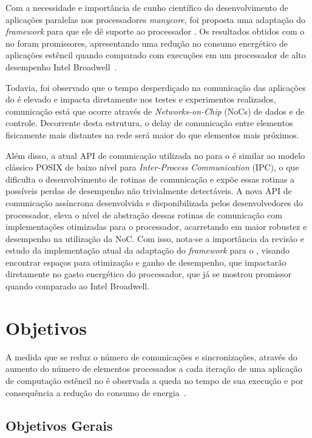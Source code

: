 Com a necessidade e importância de cunho científico do desenvolvimento de aplicações paralelas nos processadores \textit{manycore}, foi proposta uma adaptação do \textit{framework} \pskel para que ele dê suporte ao processador \mppa. Os resultados obtidos com o \pskel no \mppa foram promissores, apresentando uma redução no consumo energético de aplicações estêncil quando comparado  com execuções em um processador de alto desempenho Intel Broadwell~\cite{wscad2017}.

Todavia, foi observado que o tempo desperdiçado na comunicação das aplicações do \mppa é elevado e impacta diretamente nos testes e experimentos realizados, comunicação está que ocorre através de \textit{Networks-on-Chip} (NoCs) de dados e de controle. Decorrente desta estrutura, o delay de comunicação entre elementos fisicamente mais distantes na rede será maior do que elementos mais próximos.

Além disso, a atual API de comunicação utilizada no \pskel para o \mppa é similar ao modelo clássico POSIX de baixo nível para \textit{Inter-Process Communication} (IPC), o que dificulta o desenvolvimento de rotinas de comunicação e expõe essas rotinas a possíveis perdas de desempenho não trivialmente detectáveis. A nova API de comunicação assíncrona desenvolvida e disponibilizada pelos desenvolvedores do processador, eleva o nível de abstração dessas rotinas de comunicação com implementações otimizadas para o processador, acarretando em maior robustez e desempenho na utilização da NoC. Com isso, nota-se a importância da revisão e estudo da implementação atual da adaptação do \textit{framework} \pskel para o \mppa, visando encontrar espaços para otimização e ganho de desempenho, que impactarão diretamente no gasto energético do processador, que já se mostrou promissor quando comparado ao Intel Broadwell. 

\section{Objetivos}
\label{sec:objetivos}
A medida que se reduz o número de comunicações e sincronizações, através do aumento do número de elementos processados a cada iteração de uma aplicação de computação estêncil no \mppa é observada a queda no tempo de sua execução e por consequência a redução do consumo de energia~\cite{wscad2017}.

\subsection{Objetivos Gerais}
\label{subsec:objetivos-gerais}

